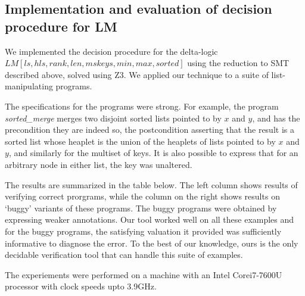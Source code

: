 \subsection{Implementation and evaluation of decision procedure for LM}

\begin{sloppypar}We implemented the decision procedure for the delta-logic $LM[ls, hls, rank, len, mskeys, min, max, sorted]$ using the reduction to SMT described above, solved using Z3. We applied our technique to a suite of list-manipulating programs.\end{sloppypar}

The specifications for the programs were strong. For example, the program \textit{sorted\_merge} merges two disjoint sorted lists pointed to by $x$ and $y$, and has the precondition they are indeed so, the postcondition asserting that the result is a sorted list whose heaplet is the union of the heaplets of lists pointed to by $x$ and $y$, and similarly for the multiset of keys. It is also possible to express that for an arbitrary node in either list, the key was unaltered.

The results are summarized in the table below. The left column shows results of verifying correct prorgrams, while the column on the right shows results on `buggy' variants of these programs. The buggy programs were obtained by expressing weaker annotations. Our tool worked well on all these examples and for the buggy programs, the satisfying valuation it provided was sufficiently informative to diagnose the error. To the best of our knowledge, ours is the only decidable verification tool that can handle this suite of examples.

The experiements were performed on a machine with an Intel\textsuperscript{\textregistered}  Core\texttrademark  i7-7600U processor with clock speeds upto 3.9GHz.